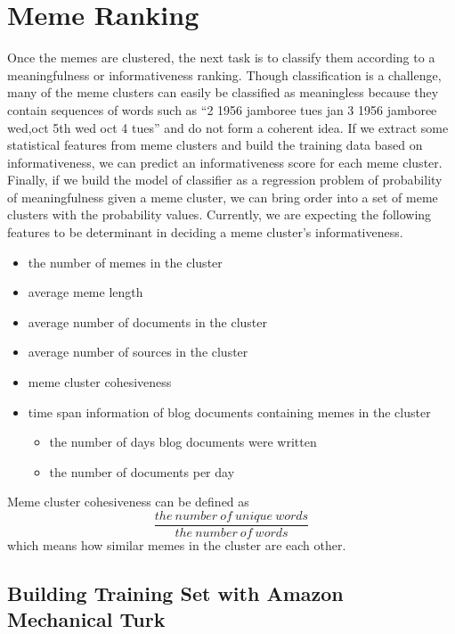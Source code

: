 \documentclass{sig-alternate}
\begin{document}
\section{Meme Ranking}
Once the memes are clustered, the next task is to classify them according to a meaningfulness or informativeness ranking. Though classification is a challenge, many of the meme clusters can easily be classified as meaningless because they contain sequences of words such as “2 1956 jamboree tues jan 3 1956 jamboree wed,oct 5th wed oct 4 tues” and do not form a coherent idea. If we extract some statistical features from meme clusters and build the training data based on informativeness, we can predict an informativeness score for each meme cluster. Finally, if we build the model of classifier as a regression problem of probability of meaningfulness given a meme cluster, we can bring order into a set of meme clusters with the probability values. Currently, we are expecting the following features to be determinant in deciding a meme cluster's informativeness.
\begin{itemize}
 \item the number of memes in the cluster
 \item average meme length
 \item average number of documents in the cluster
 \item average number of sources in the cluster
 \item meme cluster cohesiveness
 \item time span information of blog documents containing memes in the cluster
  \begin{itemize}
    \item the number of days blog documents were written
    \item the number of documents per day
  \end{itemize}
\end{itemize}
Meme cluster cohesiveness can be defined as 
\begin{displaymath}
\frac{the\ number\ of\ unique\ words}{the\ number\ of\ words}
\end{displaymath}
which means how similar memes in the cluster are each other.

\subsection{Building Training Set with Amazon Mechanical Turk}
\end{document}
